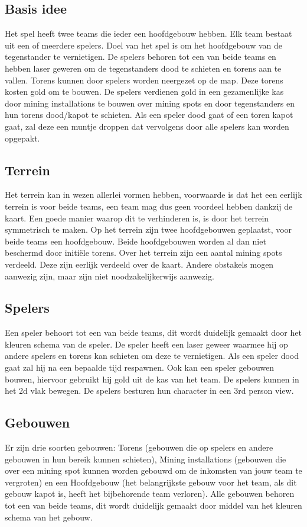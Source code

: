 \subsection{Basis idee}
Het spel heeft twee teams die ieder een hoofdgebouw hebben. Elk team bestaat uit een of meerdere spelers. Doel van het spel is om het hoofdgebouw van de tegenstander te vernietigen. De spelers behoren tot een van beide teams en hebben laser geweren om de tegenstanders dood te schieten en torens aan te vallen. Torens kunnen door spelers worden neergezet op de map. Deze torens kosten gold om te bouwen. De spelers verdienen gold in een gezamenlijke kas door mining installations te bouwen over mining spots en door tegenstanders en hun torens dood/kapot te schieten. Als een speler dood gaat of een toren kapot gaat, zal deze een muntje droppen dat vervolgens door alle spelers kan worden opgepakt.

\subsection{Terrein}
Het terrein kan in wezen allerlei vormen hebben, voorwaarde is dat het een eerlijk terrein is voor beide teams, een team mag dus geen voordeel hebben dankzij de kaart. Een goede manier waarop dit te verhinderen is, is door het terrein symmetrisch te maken. Op het terrein zijn twee hoofdgebouwen geplaatst, voor beide teams een hoofdgebouw. Beide hoofdgebouwen worden al dan niet beschermd door initi\"ele torens. Over het terrein zijn een aantal mining spots verdeeld. Deze zijn eerlijk verdeeld over de kaart. Andere obstakels mogen aanwezig zijn, maar zijn niet noodzakelijkerwijs aanwezig.

\subsection{Spelers}
Een speler behoort tot een van beide teams, dit wordt duidelijk gemaakt door het kleuren schema van de speler. De speler heeft een laser geweer waarmee hij op andere spelers en torens kan schieten om deze te vernietigen. Als een speler dood gaat zal hij na een bepaalde tijd respawnen. Ook kan een speler gebouwen bouwen, hiervoor gebruikt hij gold uit de kas van het team. De spelers kunnen in het 2d vlak bewegen. De spelers besturen hun character in een 3rd person view.

\subsection{Gebouwen}
Er zijn drie soorten gebouwen: Torens (gebouwen die op spelers en andere gebouwen in hun bereik kunnen schieten), Mining installations (gebouwen die over een mining spot kunnen worden gebouwd om de inkomsten van jouw team te vergroten) en een Hoofdgebouw (het belangrijkste gebouw voor het team, als dit gebouw kapot is, heeft het bijbehorende team verloren). Alle gebouwen behoren tot een van beide teams, dit wordt duidelijk gemaakt door middel van het kleuren schema van het gebouw.

